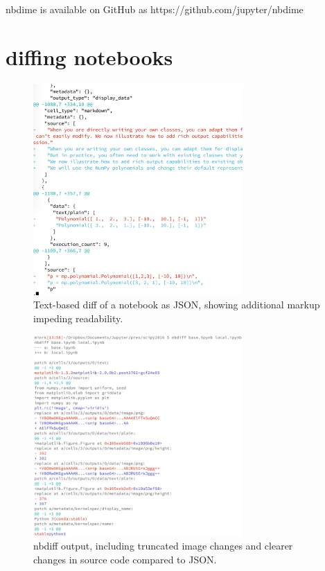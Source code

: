\documentclass{deliverablereport}
\begin{document}
nbdime is available on GitHub as https://github.com/jupyter/nbdime

\section{diffing notebooks} %
\label{sec:diffing_notebooks}

\begin{figure}
    \center
    \includegraphics[width=8cm]{img/json-diff}
    \caption{Text-based diff of a notebook as JSON, showing additional markup impeding readability.}
    \label{fig:json-diff}
\end{figure}

\begin{figure}
    \center
    \includegraphics[width=8cm]{img/nbdiff}
    \caption{nbdiff output, including truncated image changes and clearer changes in source code compared to JSON.}
    \label{fig:nbdiff}
\end{figure}
\end{document}
